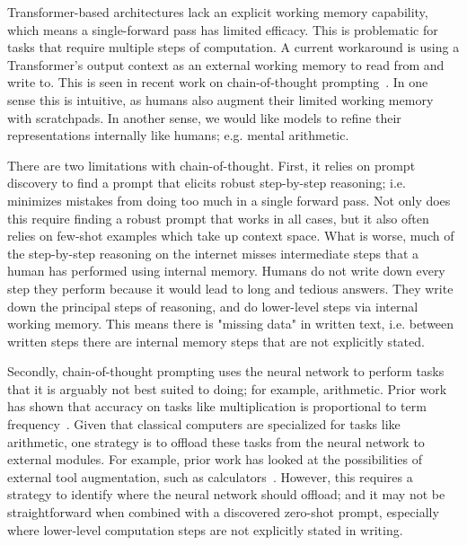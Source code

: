 Transformer-based architectures lack an explicit working memory capability, which means a single-forward pass has limited efficacy. This is problematic for tasks that require multiple steps of computation. A current workaround is using a Transformer's output context as an external working memory to read from and write to. This is seen in recent work on chain-of-thought prompting~\citep{ChainOfThought, CoTBigBENCH}. In one sense this is intuitive, as humans also augment their limited working memory with scratchpads. In another sense, we would like models to refine their representations internally like humans; e.g. mental arithmetic.

There are two limitations with chain-of-thought. First, it relies on prompt discovery to find a prompt that elicits robust step-by-step reasoning; i.e. minimizes mistakes from doing too much in a single forward pass. Not only does this require finding a robust prompt that works in all cases, but it also often relies on few-shot examples which take up context space. What is worse, much of the step-by-step reasoning on the internet misses intermediate steps that a human has performed using internal memory. Humans do not write down every step they perform because it would lead to long and tedious answers. They write down the principal steps of reasoning, and do lower-level steps via internal working memory. This means there is "missing data" in written text, i.e. between written steps there are internal memory steps that are not explicitly stated.

Secondly, chain-of-thought prompting uses the neural network to perform tasks that it is arguably not best suited to doing; for example, arithmetic. Prior work has shown that accuracy on tasks like multiplication is proportional to term frequency~\citep{PretrainingFrequency}. Given that classical computers are specialized for tasks like arithmetic, one strategy is to offload these tasks from the neural network to external modules. For example, prior work has looked at the possibilities of external tool augmentation, such as calculators~\citep{LaMBDA}. However, this requires a strategy to identify where the neural network should offload; and it may not be straightforward when combined with a discovered zero-shot prompt, especially where lower-level computation steps are not explicitly stated in writing.

